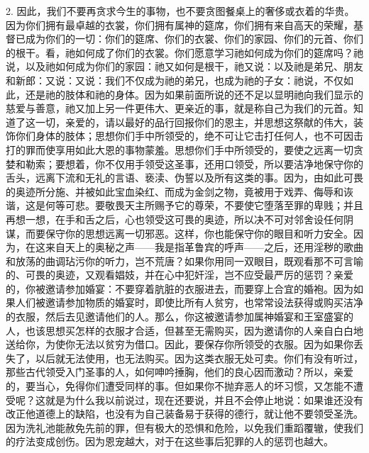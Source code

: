 2. 因此，我们不要再贪求今生的事物，也不要贪图餐桌上的奢侈或衣着的华贵。因为你们拥有最卓越的衣裳，你们拥有属神的筵席，你们拥有来自高天的荣耀，基督已成为你们的一切：你们的筵席、你们的衣裳、你们的家园、你们的元首、你们的根干。看，祂如何成了你们的衣裳。你们愿意学习祂如何成为你们的筵席吗？祂说，以及祂如何成为你们的家园：祂又如何是根干，祂又说：以及祂是弟兄、朋友和新郎：又说：又说：我们不仅成为祂的弟兄，也成为祂的子女：祂说，不仅如此，还是祂的肢体和祂的身体。因为如果前面所说的还不足以显明祂向我们显示的慈爱与善意，祂又加上另一件更伟大、更亲近的事，就是称自己为我们的元首。知道了这一切，亲爱的，请以最好的品行回报你们的恩主，并思想这祭献的伟大，装饰你们身体的肢体；思想你们手中所领受的，绝不可让它击打任何人，也不可因击打的罪而使享用如此大恩的事物蒙羞。思想你们手中所领受的，要使之远离一切贪婪和勒索；要想着，你不仅用手领受这圣事，还用口领受，所以要洁净地保守你的舌头，远离下流和无礼的言语、亵渎、伪誓以及所有这类的事。因为，由如此可畏的奥迹所分施、并被如此宝血染红、而成为金剑之物，竟被用于戏弄、侮辱和诙谐，这是何等可悲。要敬畏天主所赐予它的尊荣，不要使它堕落至罪的卑贱；并且再想一想，在手和舌之后，心也领受这可畏的奥迹，所以决不可对邻舍设任何阴谋，而要保守你的思想远离一切邪恶。这样，你也能保守你的眼目和听力安全。因为，在这来自天上的奥秘之声——我是指革鲁宾的呼声——之后，还用淫秽的歌曲和放荡的曲调玷污你的听力，岂不荒唐？如果你用同一双眼目，既观看那不可言喻的、可畏的奥迹，又观看娼妓，并在心中犯奸淫，岂不应受最严厉的惩罚？亲爱的，你被邀请参加婚宴：不要穿着肮脏的衣服进去，而要穿上合宜的婚袍。因为如果人们被邀请参加物质的婚宴时，即使比所有人贫穷，也常常设法获得或购买洁净的衣服，然后去见邀请他们的人。那么，你这被邀请参加属神婚宴和王室盛宴的人，也该思想买怎样的衣服才合适，但甚至无需购买，因为邀请你的人亲自白白地送给你，为使你无法以贫穷为借口。因此，要保存你所领受的衣服。因为如果你丢失了，以后就无法使用，也无法购买。因为这类衣服无处可卖。你们有没有听过，那些古代领受入门圣事的人，如何呻吟捶胸，他们的良心因而激动？所以，亲爱的，要当心，免得你们遭受同样的事。但如果你不抛弃恶人的坏习惯，又怎能不遭受呢？这就是为什么我以前说过，现在还要说，并且不会停止地说：如果谁还没有改正他道德上的缺陷，也没有为自己装备易于获得的德行，就让他不要领受圣洗。因为洗礼池能赦免先前的罪，但有极大的恐惧和危险，以免我们重蹈覆辙，使我们的疗法变成创伤。因为恩宠越大，对于在这些事后犯罪的人的惩罚也越大。\par

